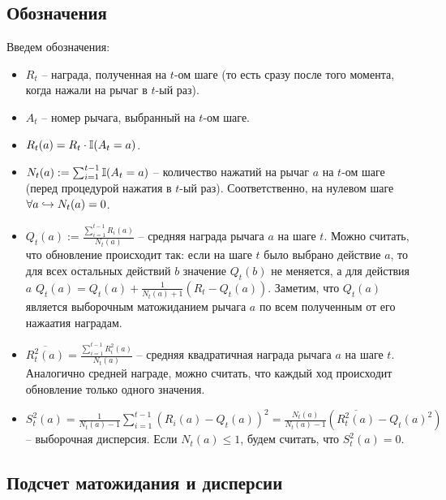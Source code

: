 \subsection{Обозначения}

Введем обозначения:
\begin{itemize}
    \item $R_t$ -- награда, полученная на $t$-ом шаге (то есть сразу после того момента, когда нажали на рычаг в $t$-ый раз).
    \item $A_t$ -- номер рычага, выбранный на $t$-ом шаге.
    \item $R_t(a) = R_t \cdot \mathbb{I}(A_t = a)$.
    \item $N_t(a) := \sum_{i=1}^{t-1} \mathbb{I}(A_t = a)$ -- количество нажатий на рычаг $a$ на $t$-ом шаге (перед процедурой нажатия в $t$-ый раз). Соответственно, на нулевом шаге $\forall a \hookrightarrow N_t(a) = 0$.
    \item $Q_t(a) := \frac{\sum_{i=1}^{t-1} R_i(a)}{N_t(a)}$ -- средняя награда рычага $a$ на шаге $t$. Можно считать, что обновление происходит так: если на шаге $t$ было выбрано действие $a$, то для всех остальных действий $b$ значение $Q_t(b)$ не меняется, а для действия $a$ $Q_t(a) = Q_t(a) + \frac{1}{N_{t}(a) + 1}(R_t - Q_t(a))$. Заметим, что $Q_t(a)$ является выборочным матожиданием рычага $a$ по всем полученным от его нажаатия наградам.
    \item $\overline{R_t^2(a)} = \frac{\sum_{i=1}^{t-1} R_i^2(a)}{N_t(a)}$ -- средняя квадратичная награда рычага $a$ на шаге $t$. Аналогично средней награде, можно считать, что каждый ход происходит обновление только одного значения.
    \item $S_t^2(a) = \frac{1}{N_t(a) - 1}\sum_{i=1}^{t-1}(R_i(a) - Q_t(a))^2 = \frac{N_t(a)}{N_t(a) - 1}(\overline{R_t^2(a)} - Q_t(a)^2)$ -- выборочная дисперсия. Если $N_t(a) \leq 1$, будем считать, что $S_t^2(a) = 0$.
\end{itemize}

\subsection{Подсчет матожидания и дисперсии}

